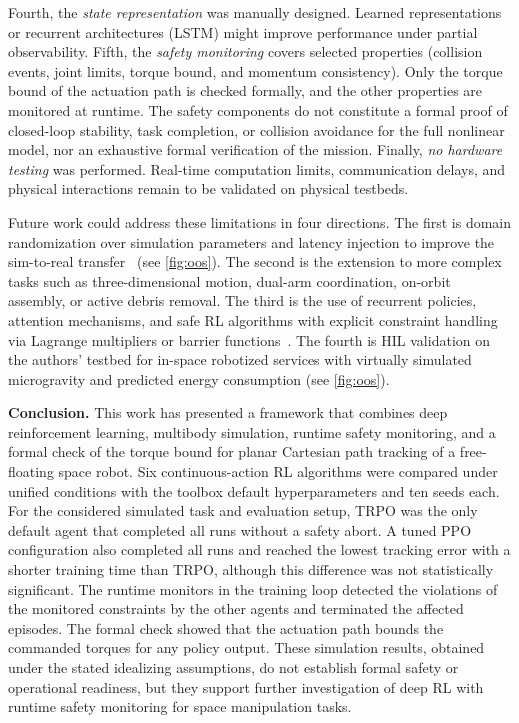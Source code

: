 \documentclass{ieeeaccess}
\begin{document}
Fourth, the \emph{state representation} was manually designed. Learned representations or recurrent
architectures (LSTM) might improve performance under partial observability. Fifth, the \emph{safety
monitoring} covers selected properties (collision events, joint limits, torque bound, and momentum
consistency). Only the torque bound of the actuation path is checked formally, and the other properties
are monitored at runtime. The safety components do not constitute a formal proof of closed-loop
stability, task completion, or collision avoidance for the full nonlinear model, nor an exhaustive
formal verification of the mission. Finally, \emph{no hardware testing} was performed. Real-time
computation limits, communication delays, and physical interactions remain to be validated on physical
testbeds.

Future work could address these limitations in four directions. The first is domain randomization over
simulation parameters and latency injection to improve the sim-to-real transfer~\cite{b8} (see
\cref{fig:oos}). The second is the extension to more complex tasks such as three-dimensional motion,
dual-arm coordination, on-orbit assembly, or active debris removal. The third is the use of recurrent
policies, attention mechanisms, and safe RL algorithms with explicit constraint handling via Lagrange
multipliers or barrier functions~\cite{b22,b24,b23,b34}. The fourth is HIL validation on the authors'
testbed for in-space robotized services with virtually simulated microgravity and predicted energy
consumption (see \cref{fig:oos}).


\textbf{Conclusion.} This work has presented a framework that combines deep reinforcement learning,
multibody simulation, runtime safety monitoring, and a formal check of the torque bound for planar
Cartesian path tracking of a free-floating space robot. Six continuous-action RL algorithms were
compared under unified conditions with the toolbox default hyperparameters and ten seeds each. For the
considered simulated task and evaluation setup, TRPO was the only default agent that completed all runs
without a safety abort. A tuned PPO configuration also completed all runs and reached the lowest tracking
error with a shorter training time than TRPO, although this difference was not statistically
significant. The runtime monitors in the training loop detected the violations of the monitored
constraints by the other agents and terminated the affected episodes. The formal check showed that the
actuation path bounds the commanded torques for any policy output. These simulation results, obtained
under the stated idealizing assumptions, do not establish formal safety or operational readiness, but
they support further investigation of deep RL with runtime safety monitoring for space manipulation
tasks.
\end{document}
